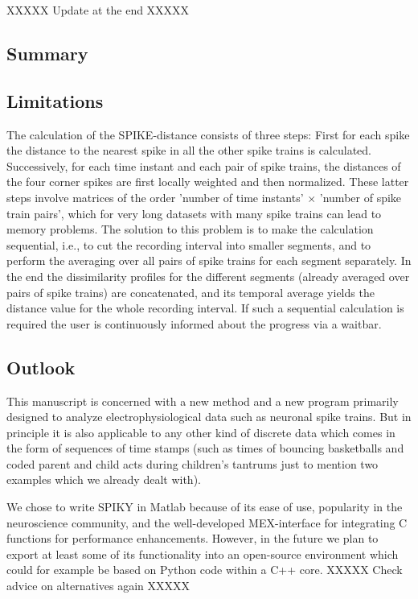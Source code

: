 \documentclass[10pt,twocolumn]{elsart5p}
\begin{document}
XXXXX Update at the end XXXXX

\subsection{\label{ss:Summary} Summary}

\subsection{\label{ss:Limitations} Limitations}

The calculation of the SPIKE-distance consists of three steps: First for each spike the distance to the nearest spike in all the other spike trains is calculated. Successively, for each time instant and each pair of spike trains, the distances of the four corner spikes are first locally weighted and then normalized. These latter steps involve matrices of the order 'number of time instants' $\times$ 'number of spike train pairs', which for very long datasets with many spike trains can lead to memory problems. The solution to this problem is to make the calculation sequential, i.e., to cut the recording interval into smaller segments, and to perform the averaging over all pairs of spike trains for each segment separately. In the end the dissimilarity profiles for the different segments (already averaged over pairs of spike trains) are concatenated, and its temporal average yields the distance value for the whole recording interval. If such a sequential calculation is required the user is continuously informed about the progress via a waitbar.



\subsection{\label{ss:Outlook} Outlook}

This manuscript is concerned with a new method and a new program primarily designed to analyze electrophysiological data such as neuronal spike trains. But in principle it is also applicable to any other kind of discrete data which comes in the form of sequences of time stamps (such as times of bouncing basketballs and coded parent and child acts during children's tantrums just to mention two examples which we already dealt with).

We chose to write SPIKY in Matlab because of its ease of use, popularity in the neuroscience community, and the well-developed MEX-interface for integrating C functions for performance enhancements. However, in the future we plan to export at least some of its functionality into an open-source environment which could for example be based on Python code within a C++ core. XXXXX Check advice on alternatives again XXXXX
\end{document}
